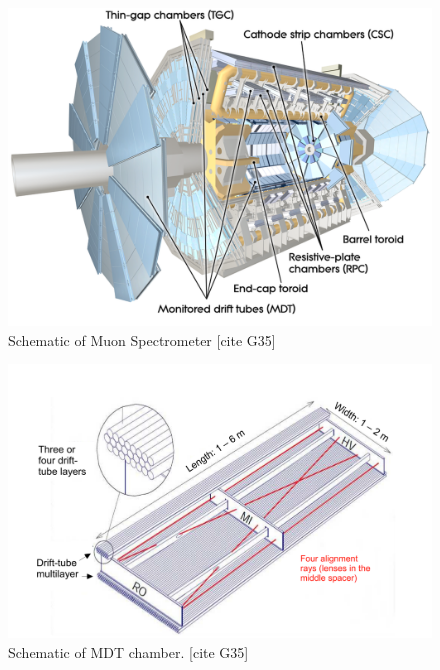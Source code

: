 \begin{figure}[h!]
  \centering
  \includegraphics[width=\hsize]{figures/Detector/muonsys.pdf}
  \caption{Schematic of Muon Spectrometer [cite G35]} 
  \label{fig:muonsys}
\end{figure}
\FloatBarrier


\begin{figure}[h!]
  \centering
  \includegraphics[width=\hsize]{figures/Detector/muon_mdt.pdf}
  \caption{Schematic of MDT chamber. [cite G35]} 
  \label{fig:muon_mdt}
\end{figure}
\FloatBarrier


